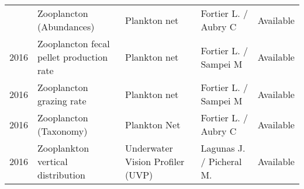 \documentclass[]{article}
\begin{document}
\begin{landscape}
\begin{longtable}{rllll}
\addlinespace
2016 & Zooplancton (Abundances) & Plankton net & Fortier L. / Aubry C & Available\\
2016 & Zooplancton fecal pellet production rate & Plankton net & Fortier L. / Sampei M & Available\\
2016 & Zooplancton grazing rate & Plankton net & Fortier L. / Sampei M & Available\\
2016 & Zooplancton (Taxonomy) & Plankton Net & Fortier L. / Aubry C & Available\\
2016 & Zooplankton vertical distribution & Underwater Vision Profiler (UVP) & Lagunas J. / Picheral M. & Available\\*
\end{longtable}
\endgroup{}
\end{landscape}
\end{document}
